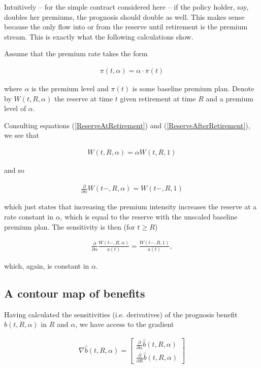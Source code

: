 \documentclass{book}
\newcommand{\1}[1]{\mathbbm{1}_{\left\lbrace #1 \right\rbrace}}
\theoremstyle{break}
\theoremstyle{remark}
\numberwithin{equation}{section}
\begin{document}
Intuitively -- for the simple contract considered here -- if the policy holder, say, doubles her premiums, the prognosis should double as well. This makes sense because the only flow into or from the reserve until retirement is the premium stream. This is exactly what the following calculations show.

Assume that the premium rate takes the form

\begin{align*}
	\pi (t,\alpha) = \alpha \cdot \pi(t)
\end{align*}

where $\alpha$ is the premium level and $\pi(t)$ is some baseline premium plan. Denote by $W(t,R,\alpha)$ the reserve at time $t$ given retirement at time $R$ and a premium level of $\alpha$.

Consulting equations (\ref{ReserveAtRetirement}) and (\ref{ReserveAfterRetirement}), we see that

\begin{align*}
	W(t,R,\alpha) = \alpha W(t,R,1)
\end{align*}

and so

\begin{align} \label{AlphaDeriv}
	\frac{\partial}{\partial \alpha }W(t-,R,\alpha) = W(t-,R,1)
\end{align}

which just states that increasing the premium intensity increases the reserve at a rate constant in $\alpha$, which is equal to the reserve with the unscaled baseline premium plan. The sensitivity is then (for $t \geq R$)

\begin{align} \label{ResDeriv}
	\frac{\partial}{\partial \alpha }\frac{W(t-,R,\alpha)}{a(t)} = \frac{W(t-,R,1)}{a(t)},
\end{align}

which, again, is constant in $\alpha$.

\subsection{A contour map of benefits}

Having calculated the sensitivities (i.e. derivatives) of the prognosis benefit $\hat{b}(t,R,\alpha)$ in $R$ and $\alpha$, we have access to the gradient

\begin{align*}
	\nabla \hat{b}(t,R,\alpha) =
	\begin{bmatrix}
		\frac{\partial}{\partial \alpha }\hat{b}(t,R,\alpha) \\
		\frac{\partial}{\partial R }\hat{b}(t,R,\alpha)
	\end{bmatrix}
\end{align*}
\end{document}
